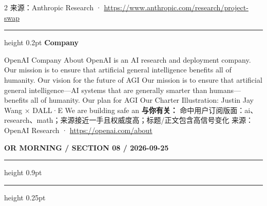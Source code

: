 \documentclass[10.5pt]{ctexart}
\begin{document}
\begin{multicols}{2}
{\footnotesize\color{ormuted} 来源：Anthropic Research · \url{https://www.anthropic.com/research/project-swap}}
\vspace{2mm}
\hrule height 0.2pt
\vspace{2mm}
{\large\bfseries Company}\par
OpenAI Company About OpenAI is an AI research and deployment company. Our mission is to ensure that artificial general intelligence benefits all of humanity. Our vision for the future of AGI Our mission is to ensure that artificial general intelligence—AI systems that are generally smarter than humans—benefits all of humanity. Our plan for AGI Our Charter Illustration: Justin Jay Wang × DALL·E We are building safe an
\textbf{与你有关：} 命中用户订阅版面：ai、research、math；来源接近一手且权威度高；标题/正文包含高信号变化
{\footnotesize\color{ormuted} 来源：OpenAI Research · \url{https://openai.com/about}}
\end{multicols}
\newpage
{\small\bfseries OR MORNING / SECTION 08 / 2026-09-25}
\vspace{2mm}
\hrule height 0.9pt
\vspace{1.5mm}
\hrule height 0.25pt
\vspace{4mm}
\end{document}
